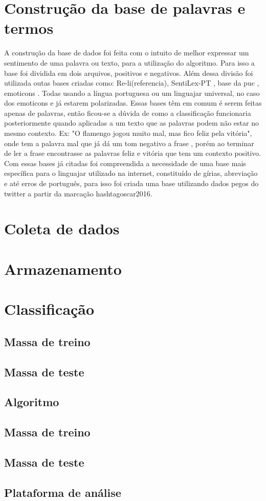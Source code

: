 \section{Construção da base de palavras e termos}
A construção da base de dados foi feita com o intuito de melhor expressar um sentimento de uma palavra ou texto, para a utilização do algoritmo. Para isso a base foi dividida em dois arquivos, positivos e negativos. Além dessa divisão foi utilizada outas bases criadas como: Re-li(referencia), SentiLex-PT \cite{marioj.silvapaulacarvalholuissarmento2012}, base da puc \cite{freitas2013construccao}, emoticons \cite{alexanderhogenboomdaniellabalflaviusfrasincarmalissabalfranciskadejonguzaykaymak}. Todas usando a língua portuguesa ou um linguajar universal, no caso dos emoticons e já estarem polarizadas. Essas bases têm em comum é serem feitas apenas de palavras, então ficou-se a dúvida de como a classificação funcionaria posteriormente quando aplicadas a um texto que as palavras podem não estar no mesmo contexto. Ex: "O flamengo jogou muito mal, mas fico feliz pela vitória", onde tem a palavra mal que já dá um tom negativo a frase , porém ao terminar de ler a frase encontrasse as palavras feliz e vitória que tem um contexto positivo.
Com essas bases já citadas foi compreendida a necessidade de uma base mais específica para o linguajar utilizado na internet, constituído de  
gírias, abreviação e até erros de português, para isso foi criada uma base utilizando dados pegos do twitter a partir da marcação hashtagoscar2016.


\section{Coleta de dados}


\section{Armazenamento}


\section{Classificação}


\subsection{Massa de treino}


\subsection{Massa de teste}

\subsection{Algoritmo}



\subsection{Massa de treino}


\subsection{Massa de teste}


\subsection{Plataforma de análise}
